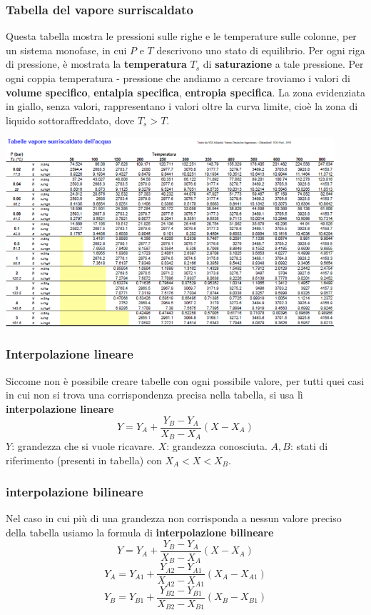 \subsubsection{Tabella del vapore surriscaldato}
Questa tabella mostra le pressioni sulle righe e le temperature sulle colonne, per un sistema monofase, in cui $P$ e $T$ descrivono uno stato di equilibrio.\newline
\newline
Per ogni riga di pressione, è mostrata la \textbf{temperatura} $T_s$ di \textbf{saturazione} a tale pressione.\newline
\newline
Per ogni coppia temperatura - pressione che andiamo a cercare  troviamo i valori di \textbf{volume specifico}, \textbf{entalpia specifica}, \textbf{entropia specifica}.\newline
\newline
La zona evidenziata in giallo, senza valori, rappresentano i valori oltre la curva limite, cioè la zona di liquido sottoraffreddato, dove $T_s > T$.
\begin{center}
    \includegraphics[height=7cm]{../L04/img12.PNG}
\end{center}
\subsubsection{Interpolazione lineare}
Siccome non è possibile creare tabelle con ogni possibile valore, per tutti quei casi in cui non si trova una corrispondenza precisa nella tabella, si usa lì \textbf{interpolazione lineare}
\[
    Y = Y_A + \frac{Y_B - Y_A}{X_B - X_A}(X - X_A)
\]
$Y$: grandezza che si vuole ricavare.\newline
$X$: grandezza conosciuta.\newline
$A,B$: stati di riferimento (presenti in tabella) con $X_A < X < X_B$.
\subsubsection{interpolazione bilineare}
Nel caso in cui più di una grandezza non corrisponda a nessun valore preciso della tabella usiamo la formula di \textbf{interpolazione bilineare}
\[
    Y = Y_A + \frac{Y_B - Y_A}{X_B - X_A}(X - X_A)
\]
\[
    Y_A = Y_{A1} + \frac{Y_{A2}- Y_{A1}}{X_{A2}- X_{A1}} (X_A - X_{A1})
\]
\[
    Y_B = Y_{B1} + \frac{Y_{B2}- Y_{B1}}{X_{B2}- X_{B1}} (X_B - X_{B1})
\]

